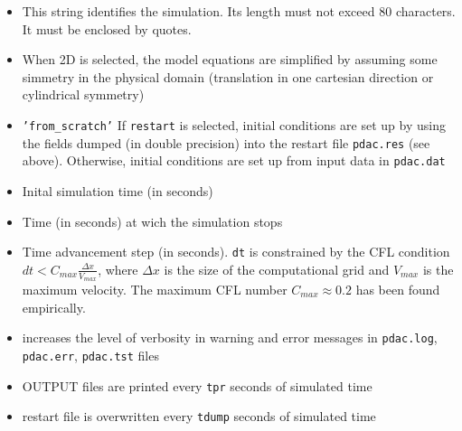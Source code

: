 \begin{itemize}
\item
{}
{This string identifies the simulation. Its length must not exceed 80 characters. It must be enclosed by quotes.}

\item
{}
{When 2D is selected, the model equations are simplified by assuming
some simmetry in the physical domain (translation in one cartesian 
direction or cylindrical symmetry)}

\item
{}
{{\tt 'from\_scratch'}}
{If {\tt restart} is selected, initial conditions are set up by using the fields
dumped (in double precision) into the restart file {\tt pdac.res} (see above). 
Otherwise, initial conditions are set up from input data in {\tt pdac.dat}} 

\item
{}
{Inital simulation time (in seconds)}

\item
{}
{Time (in seconds) at wich the simulation stops}

\item
{}
{Time advancement step (in seconds). 
{\tt dt} is constrained by the CFL condition
$dt < C_{max}\frac{\Delta x}{V_{max}}$, where $\Delta x$ is
the size of the computational grid and $V_{max}$ is the maximum
velocity. The maximum CFL number $C_{max}\approx 0.2$ has been 
found empirically.}

\item
{}
{increases the level of verbosity in warning and error messages 
in {\tt pdac.log}, {\tt pdac.err}, {\tt pdac.tst} files}

\item
{}
{OUTPUT files are printed every {\tt tpr} seconds of simulated time}

\item
{}
{restart file is overwritten every {\tt tdump} seconds of simulated time}


\end{itemize}
